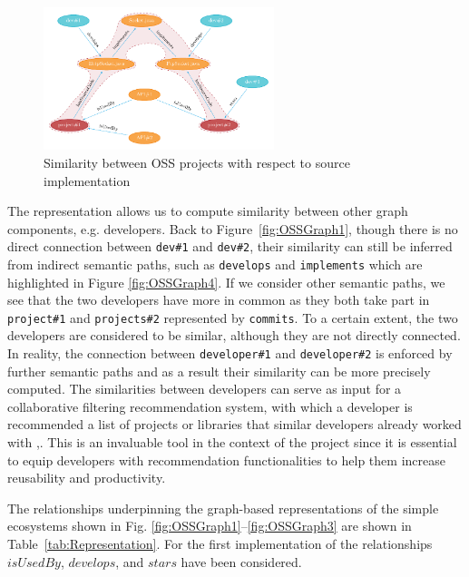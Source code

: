  
 \begin{figure}[h!]
 	\centering
 	\includegraphics[width=0.60\textwidth]{images/OSSGraph2.pdf}
 	\caption{Similarity between OSS projects with respect to source implementation}
 	\label{fig:OSSGraph2}
 \end{figure}
 
 
The representation allows us to compute similarity between other graph components, e.g. developers. Back to Figure~\ref{fig:OSSGraph1}, though there is no direct connection between \texttt{dev\#1} and \texttt{dev\#2}, their similarity can still be inferred from indirect semantic paths, such as \texttt{develops} and \texttt{implements} which are highlighted in Figure \ref{fig:OSSGraph4}.
If we consider other semantic paths, we see that the two developers have more in common as they both take part in \texttt{project\#1} and \texttt{projects\#2} represented by \texttt{commits}. To a certain extent, the two developers are considered to be similar, although they are not directly connected. In reality, the connection between \texttt{developer\#1} and \texttt{developer\#2} is enforced by further semantic paths and as a result their similarity can be more precisely computed. The similarities between developers can serve as input for a collaborative filtering recommendation system, with which a developer is recommended a list of projects or libraries that similar developers already worked with \cite{Pazzani2007},\cite{Schafer:2007:CFR:1768197.1768208}. This is an invaluable tool in the context of the \projectName project since it is essential to equip developers with recommendation functionalities to help them increase reusability and productivity.
 
 

 
 
The relationships underpinning the graph-based representations of the simple ecosystems shown in Fig. \ref{fig:OSSGraph1}--\ref{fig:OSSGraph3} are shown in Table~\ref{tab:Representation}. For the first implementation of \CrossSim the relationships $isUsedBy$, $develops$, and $stars$ have been considered. 
 
